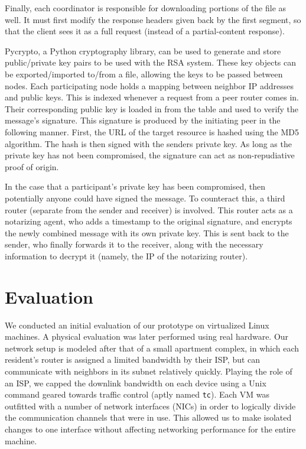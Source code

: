 \documentclass[12pt]{article}
\begin{document}
			Finally, each coordinator is responsible for downloading portions of the file as well. It must first modify the response headers given back by the first segment, so that the client sees it as a full request (instead of a partial-content response).

			Pycrypto, a Python cryptography library, can be used to generate and store public/private key pairs to be used with the RSA system. These key objects can be exported/imported to/from a file, allowing the keys to be passed between nodes. Each participating node holds a mapping between neighbor IP addresses and public keys. This is indexed whenever a request from a peer router comes in. Their corresponding public key is loaded in from the table and used to verify the message's signature. This signature is produced by the initiating peer in the following manner. First, the URL of the target resource is hashed using the MD5 algorithm. The hash is then signed with the senders private key. As long as the private key has not been compromised, the signature can act as non-repudiative proof of origin.

			In the case that a participant's private key has been compromised, then potentially anyone could have signed the message. To counteract this, a third router (separate from the sender and receiver) is involved. This router acts as a notarizing agent, who adds a timestamp to the original signature, and encrypts the newly combined message with its own private key. This is sent back to the sender, who finally forwards it to the receiver, along with the necessary information to decrypt it (namely, the IP of the notarizing router).




\newpage
\section{Evaluation}

	We conducted an initial evaluation of our prototype on virtualized Linux machines. A physical evaluation was later performed using real hardware. Our network setup is modeled after that of a small apartment complex, in which each resident's router is assigned a limited bandwidth by their ISP, but can communicate with neighbors in its subnet relatively quickly. Playing the role of an ISP, we capped the downlink bandwidth on each device using a Unix command geared towards traffic control (aptly named \texttt{tc}). Each VM was outfitted with a number of network interfaces (NICs) in order to logically divide the communication channels that were in use. This allowed us to make isolated changes to one interface without affecting networking performance for the entire machine. 
\end{document}
